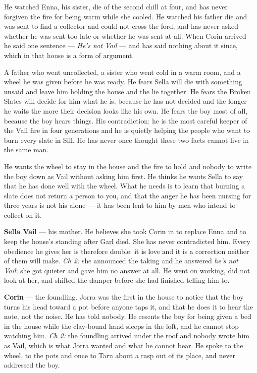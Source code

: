 \documentclass{design/chronicle}
\begin{document}
{He watched Enna, his sister, die of the second chill at four, and has never forgiven the fire for being warm while she cooled. He watched his father die and was sent to find a collector and could not cross the ford, and has never asked whether he was sent too late or whether he was sent at all. When Corin arrived he said one sentence — \emph{He’s not Vail} — and has said nothing about it since, which in that house is a form of argument.

A father who went uncollected, a sister who went cold in a warm room, and a wheel he was given before he was ready. He fears Sella will die with something unsaid and leave him holding the house and the lie together. He fears the Broken Slates will decide for him what he is, because he has not decided and the longer he waits the more their decision looks like his own. He fears the boy most of all, because the boy hears things. His contradiction: he is the most careful keeper of the Vail fire in four generations and he is quietly helping the people who want to burn every slate in Sill. He has never once thought these two facts cannot live in the same man.

He wants the wheel to stay in the house and the fire to hold and nobody to write the boy down as Vail without asking him first. He thinks he wants Sella to say that he has done well with the wheel. What he needs is to learn that burning a slate does not return a person to you, and that the anger he has been nursing for three years is not his alone — it has been lent to him by men who intend to collect on it.

\textbf{Sella Vail} — his mother. He believes she took Corin in to replace Enna and to keep the house’s standing after Garl died. She has never contradicted him. Every obedience he gives her is therefore double: it is love and it is a correction neither of them will make. \emph{Ch 2:} she announced the taking and he answered \emph{he’s not Vail}; she got quieter and gave him no answer at all. He went on working, did not look at her, and shifted the damper before she had finished telling him to.

\textbf{Corin} — the foundling. Jorra was the first in the house to notice that the boy turns his head toward a pot before anyone taps it, and that he does it to hear the note, not the noise. He has told nobody. He resents the boy for being given a bed in the house while the clay-bound hand sleeps in the loft, and he cannot stop watching him. \emph{Ch 2:} the foundling arrived under the roof and nobody wrote him as Vail, which is what Jorra wanted and what he cannot bear. He spoke to the wheel, to the pots and once to Tarn about a rasp out of its place, and never addressed the boy.

}
\end{document}
